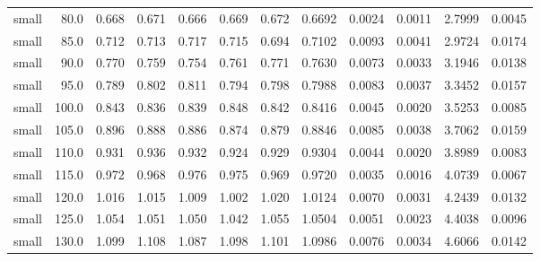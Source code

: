 \documentclass[11pt,a4paper]{article}
\begin{document}
\begin{table}[H]
\begin{tabular}{lrrrrrrrrrrr}
small & 80.0 & 0.668 & 0.671 & 0.666 & 0.669 & 0.672 & 0.6692 & 0.0024 & 0.0011 & 2.7999 & 0.0045 \\
small & 85.0 & 0.712 & 0.713 & 0.717 & 0.715 & 0.694 & 0.7102 & 0.0093 & 0.0041 & 2.9724 & 0.0174 \\
small & 90.0 & 0.770 & 0.759 & 0.754 & 0.761 & 0.771 & 0.7630 & 0.0073 & 0.0033 & 3.1946 & 0.0138 \\
small & 95.0 & 0.789 & 0.802 & 0.811 & 0.794 & 0.798 & 0.7988 & 0.0083 & 0.0037 & 3.3452 & 0.0157 \\
small & 100.0 & 0.843 & 0.836 & 0.839 & 0.848 & 0.842 & 0.8416 & 0.0045 & 0.0020 & 3.5253 & 0.0085 \\
small & 105.0 & 0.896 & 0.888 & 0.886 & 0.874 & 0.879 & 0.8846 & 0.0085 & 0.0038 & 3.7062 & 0.0159 \\
small & 110.0 & 0.931 & 0.936 & 0.932 & 0.924 & 0.929 & 0.9304 & 0.0044 & 0.0020 & 3.8989 & 0.0083 \\
small & 115.0 & 0.972 & 0.968 & 0.976 & 0.975 & 0.969 & 0.9720 & 0.0035 & 0.0016 & 4.0739 & 0.0067 \\
small & 120.0 & 1.016 & 1.015 & 1.009 & 1.002 & 1.020 & 1.0124 & 0.0070 & 0.0031 & 4.2439 & 0.0132 \\
small & 125.0 & 1.054 & 1.051 & 1.050 & 1.042 & 1.055 & 1.0504 & 0.0051 & 0.0023 & 4.4038 & 0.0096 \\
small & 130.0 & 1.099 & 1.108 & 1.087 & 1.098 & 1.101 & 1.0986 & 0.0076 & 0.0034 & 4.6066 & 0.0142 \\
\bottomrule
\end{tabular}
\end{table}
\end{document}
